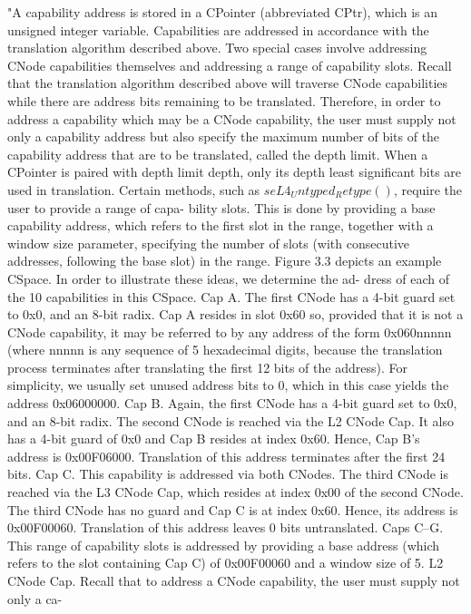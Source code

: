 "A capability address is stored in a CPointer (abbreviated CPtr), which is an unsigned integer
variable. Capabilities are addressed in accordance with the translation algorithm described
above. Two special cases involve addressing CNode capabilities themselves and addressing a
range of capability slots.
Recall that the translation algorithm described above will traverse CNode capabilities while there
are address bits remaining to be translated. Therefore, in order to address a capability which
may be a CNode capability, the user must supply not only a capability address but also specify
the maximum number of bits of the capability address that are to be translated, called the depth
limit. When a CPointer is paired with depth limit depth, only its depth least significant bits are
used in translation.
Certain methods, such as $seL4_Untyped_Retype()$, require the user to provide a range of capa-
bility slots. This is done by providing a base capability address, which refers to the first slot in the
range, together with a window size parameter, specifying the number of slots (with consecutive
addresses, following the base slot) in the range.
Figure 3.3 depicts an example CSpace. In order to illustrate these ideas, we determine the ad-
dress of each of the 10 capabilities in this CSpace.
Cap A. The first CNode has a 4-bit guard set to 0x0, and an 8-bit radix. Cap A resides in slot
0x60 so, provided that it is not a CNode capability, it may be referred to by any address
of the form 0x060nnnnn (where nnnnn is any sequence of 5 hexadecimal digits, because
the translation process terminates after translating the first 12 bits of the address). For
simplicity, we usually set unused address bits to 0, which in this case yields the address
0x06000000.
Cap B. Again, the first CNode has a 4-bit guard set to 0x0, and an 8-bit radix. The second CNode
is reached via the L2 CNode Cap. It also has a 4-bit guard of 0x0 and Cap B resides at index
0x60. Hence, Cap B’s address is 0x00F06000. Translation of this address terminates after
the first 24 bits.
Cap C. This capability is addressed via both CNodes. The third CNode is reached via the L3
CNode Cap, which resides at index 0x00 of the second CNode. The third CNode has no
guard and Cap C is at index 0x60. Hence, its address is 0x00F00060. Translation of this
address leaves 0 bits untranslated.
Caps C–G. This range of capability slots is addressed by providing a base address (which refers
to the slot containing Cap C) of 0x00F00060 and a window size of 5.
L2 CNode Cap. Recall that to address a CNode capability, the user must supply not only a ca-
